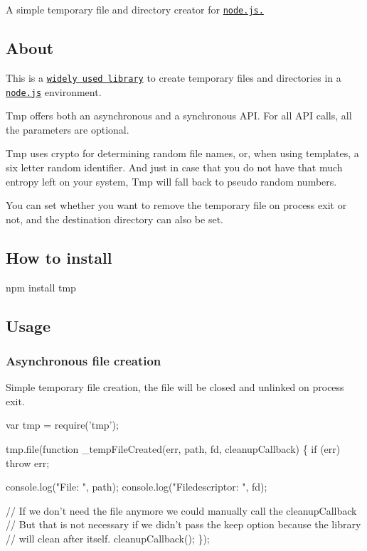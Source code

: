 A simple temporary file and directory creator for \href{http://nodejs.org/}{\tt node.\+js.}

\href{https://travis-ci.org/raszi/node-tmp}{\tt } \href{https://david-dm.org/raszi/node-tmp}{\tt } \href{https://badge.fury.io/js/tmp}{\tt }

\subsection*{About}

This is a \href{https://www.npmjs.com/browse/depended/tmp}{\tt widely used library} to create temporary files and directories in a \href{http://nodejs.org/}{\tt node.\+js} environment.

Tmp offers both an asynchronous and a synchronous A\+PI. For all A\+PI calls, all the parameters are optional.

Tmp uses crypto for determining random file names, or, when using templates, a six letter random identifier. And just in case that you do not have that much entropy left on your system, Tmp will fall back to pseudo random numbers.

You can set whether you want to remove the temporary file on process exit or not, and the destination directory can also be set.

\subsection*{How to install}


\begin{DoxyCode}
npm install tmp
\end{DoxyCode}


\subsection*{Usage}

\subsubsection*{Asynchronous file creation}

Simple temporary file creation, the file will be closed and unlinked on process exit.


\begin{DoxyCode}
var tmp = require('tmp');

tmp.file(function \_tempFileCreated(err, path, fd, cleanupCallback) \{
  if (err) throw err;

  console.log("File: ", path);
  console.log("Filedescriptor: ", fd);

  // If we don't need the file anymore we could manually call the cleanupCallback
  // But that is not necessary if we didn't pass the keep option because the library
  // will clean after itself.
  cleanupCallback();
\});
\end{DoxyCode}


